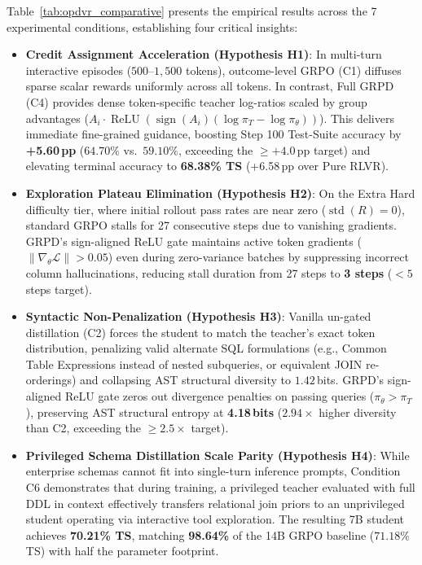 \documentclass{article}
\theoremstyle{plain}
\theoremstyle{definition}
\theoremstyle{remark}
\begin{document}
Table~\ref{tab:opdvr_comparative} presents the empirical results across the 7 experimental conditions, establishing four critical insights:
\begin{itemize}[leftmargin=*,itemsep=1pt]
    \item \textbf{Credit Assignment Acceleration (Hypothesis H1)}: In multi-turn interactive episodes ($500$--$1,500$ tokens), outcome-level GRPO (C1) diffuses sparse scalar rewards uniformly across all tokens. In contrast, Full GRPD (C4) provides dense token-specific teacher log-ratios scaled by group advantages ($A_i \cdot \operatorname{ReLU}(\operatorname{sign}(A_i)(\log \pi_T - \log \pi_\theta))$). This delivers immediate fine-grained guidance, boosting Step 100 Test-Suite accuracy by \textbf{+5.60\,pp} ($64.70\%$ vs.\ $59.10\%$, exceeding the $\ge +4.0$\,pp target) and elevating terminal accuracy to \textbf{68.38\% TS} (+6.58\,pp over Pure RLVR).
    \item \textbf{Exploration Plateau Elimination (Hypothesis H2)}: On the Extra Hard difficulty tier, where initial rollout pass rates are near zero ($\operatorname{std}(R)=0$), standard GRPO stalls for 27 consecutive steps due to vanishing gradients. GRPD's sign-aligned ReLU gate maintains active token gradients ($\|\nabla_\theta \mathcal{L}\| > 0.05$) even during zero-variance batches by suppressing incorrect column hallucinations, reducing stall duration from 27 steps to \textbf{3 steps} ($< 5$ steps target).
    \item \textbf{Syntactic Non-Penalization (Hypothesis H3)}: Vanilla un-gated distillation (C2) forces the student to match the teacher's exact token distribution, penalizing valid alternate SQL formulations (e.g., Common Table Expressions instead of nested subqueries, or equivalent JOIN re-orderings) and collapsing AST structural diversity to $1.42$\,bits. GRPD's sign-aligned ReLU gate zeros out divergence penalties on passing queries ($\pi_\theta > \pi_T$), preserving AST structural entropy at \textbf{4.18\,bits} ($2.94\times$ higher diversity than C2, exceeding the $\ge 2.5\times$ target).
    \item \textbf{Privileged Schema Distillation Scale Parity (Hypothesis H4)}: While enterprise schemas cannot fit into single-turn inference prompts, Condition C6 demonstrates that during training, a privileged teacher evaluated with full DDL in context effectively transfers relational join priors to an unprivileged student operating via interactive tool exploration. The resulting 7B student achieves \textbf{70.21\% TS}, matching \textbf{98.64\%} of the 14B GRPO baseline ($71.18\%$ TS) with half the parameter footprint.
\end{itemize}
\end{document}
